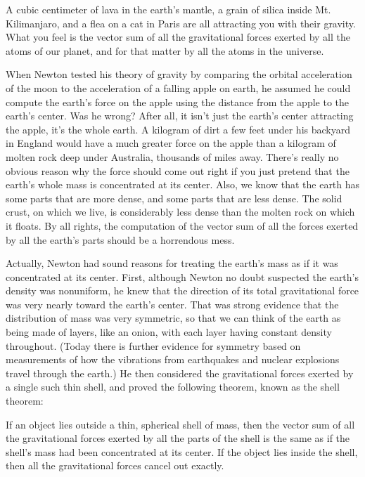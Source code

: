 A cubic centimeter of lava in the earth's mantle, a grain of
silica inside Mt. Kilimanjaro, and a flea on a cat in Paris
are all attracting you with their gravity. What you feel is
the vector sum of all the gravitational forces exerted by
all the atoms of our planet, and for that matter by all the
atoms in the universe.

When Newton tested his theory of gravity by comparing the
orbital acceleration of the moon to the acceleration of a
falling apple on earth, he assumed he could compute the
earth's force on the apple using the distance from the apple
to the earth's center. Was he wrong? After all, it isn't
just the earth's center attracting the apple, it's the whole
earth. A kilogram of dirt a few feet under his backyard in
England would have a much greater force on the apple than a
kilogram of molten rock deep under Australia, thousands of
miles away. There's really no obvious reason why the force
should come out right if you just pretend that the earth's
whole mass is concentrated at its center. Also, we know that
the earth has some parts that are more dense, and some parts
that are less dense. The solid crust, on which we live, is
considerably less dense than the molten rock on which it
floats. By all rights, the computation of the vector sum of
all the forces exerted by all the earth's parts should
be a horrendous mess.

Actually, Newton had sound reasons for treating
the earth's mass as if it was concentrated at its center.
First, although Newton no doubt suspected the earth's
density was nonuniform, he knew that the direction of its
total gravitational force was very nearly toward the earth's
center. That was strong evidence that the distribution of
mass was very symmetric, so that we can think of the earth
as being made of layers, like an onion, with each layer
having constant density throughout. (Today there is further
evidence for symmetry based on measurements of how the
vibrations from earthquakes and nuclear explosions travel
through the earth.) He then considered the
gravitational forces exerted by a single such thin shell,
and proved the following theorem, known
as the shell theorem:

\begin{lessimportant}
If an object lies outside a thin, spherical shell of mass,
then the vector sum of all the gravitational forces exerted
by all the parts of the shell is the same as if the shell's
mass had been concentrated at its center.  If the object
lies inside the shell, then all the gravitational forces cancel out exactly.
\end{lessimportant}

